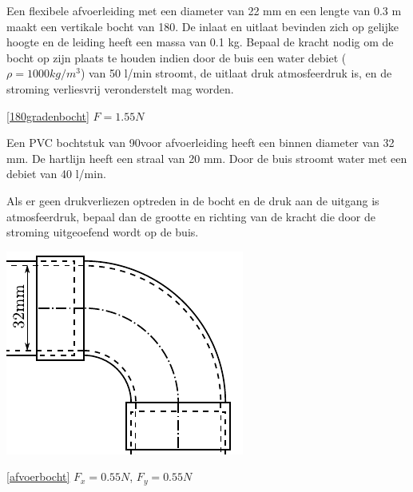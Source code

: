\begin{toepassing}
	\label{180gradenbocht}
Een flexibele afvoerleiding met een diameter van 22 mm en een lengte van 0.3 m maakt een vertikale bocht van 180\deg. De inlaat en uitlaat bevinden zich op gelijke hoogte en de leiding heeft een massa van 0.1 kg. Bepaal de kracht nodig om de bocht op zijn plaats te houden indien door de buis een water debiet ($\rho=1000\unit{kg/m^3}$) van 50 l/min stroomt, de uitlaat druk atmosfeerdruk is, en de stroming verliesvrij veronderstelt mag worden.
\end{toepassing}
\begin{antwoord}{\ref{180gradenbocht}}
	$F = 1.55\unit{N}$
\end{antwoord}
\begin{toepassing}
	\label{afvoerbocht}
Een PVC bochtstuk van 90\deg voor afvoerleiding heeft een binnen diameter van 32 mm. De hartlijn heeft een straal van 20 mm. Door de buis stroomt water met een debiet van 40 l/min.
		
Als er geen drukverliezen optreden in de bocht en de druk aan de uitgang is atmosfeerdruk, bepaal dan de grootte en richting van de kracht die door de stroming uitgeoefend wordt op de buis.

	\centering
	\includegraphics{fig/behoudsvergelijkingen/afvoerbocht}
\end{toepassing}
\begin{antwoord}{\ref{afvoerbocht}}
	$F_x = 0.55\unit{N}$, $F_y = 0.55\unit{N}$
\end{antwoord}
